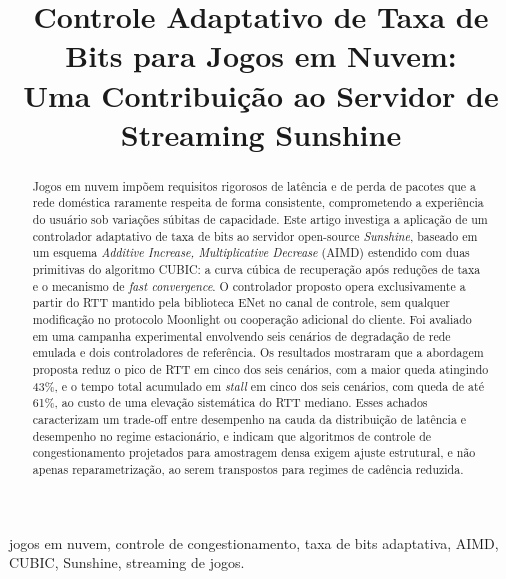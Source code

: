 \documentclass[conference]{IEEEtran}
\begin{document}
\title{Controle Adaptativo de Taxa de Bits para Jogos em Nuvem:\\
Uma Contribuição ao Servidor de Streaming Sunshine}

\author{
}

\maketitle

\begin{abstract}
Jogos em nuvem impõem requisitos rigorosos de latência e de
perda de pacotes que a rede doméstica raramente respeita de
forma consistente, comprometendo a experiência do usuário
sob variações súbitas de capacidade. Este artigo investiga a
aplicação de um controlador adaptativo de taxa de bits ao
servidor open-source \emph{Sunshine}, baseado em um esquema
\emph{Additive Increase, Multiplicative Decrease} (AIMD)
estendido com duas primitivas do algoritmo CUBIC: a curva
cúbica de recuperação após reduções de taxa e o mecanismo de
\emph{fast convergence}. O controlador proposto opera
exclusivamente a partir do RTT mantido pela biblioteca ENet
no canal de controle, sem qualquer modificação no protocolo
Moonlight ou cooperação adicional do cliente. Foi avaliado
em uma campanha experimental envolvendo seis cenários de
degradação de rede emulada e dois controladores de
referência. Os resultados mostraram que a abordagem proposta
reduz o pico de RTT em cinco dos seis cenários, com a maior
queda atingindo 43\%, e o tempo total acumulado em
\emph{stall} em cinco dos seis cenários, com queda de até
61\%, ao custo de uma elevação sistemática do RTT mediano.
Esses achados caracterizam um trade-off entre desempenho na
cauda da distribuição de latência e desempenho no regime
estacionário, e indicam que algoritmos de controle de
congestionamento projetados para amostragem densa exigem
ajuste estrutural, e não apenas reparametrização, ao serem
transpostos para regimes de cadência reduzida.
\end{abstract}

\begin{IEEEkeywords}
jogos em nuvem, controle de congestionamento, taxa de bits adaptativa,
AIMD, CUBIC, Sunshine, streaming de jogos.
\end{IEEEkeywords}










\end{document}
